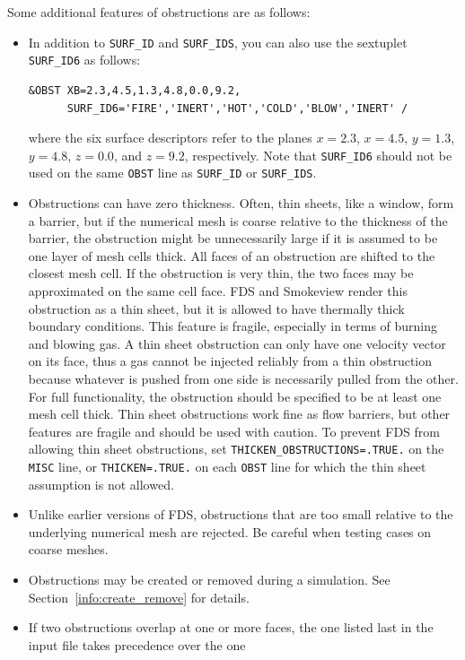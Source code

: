 \documentclass[11pt]{book}
\newcommand{\ct}{\tt\small}
\begin{document}
\noindent
Some additional features of obstructions are as follows:
\begin{itemize}
\item In addition to {\ct SURF\_ID} and {\ct SURF\_IDS}, you can also use
the sextuplet {\ct SURF\_ID6} as follows:

\footnotesize
\begin{verbatim}
&OBST XB=2.3,4.5,1.3,4.8,0.0,9.2,
      SURF_ID6='FIRE','INERT','HOT','COLD','BLOW','INERT' /
\end{verbatim}
\normalsize
where the six surface descriptors refer to the planes $x=2.3$, $x=4.5$, $y=1.3$, $y=4.8$,
$z=0.0$, and $z=9.2$, respectively.
Note that {\ct SURF\_ID6} should not be used on the same {\ct OBST}
line as {\ct SURF\_ID} or {\ct SURF\_IDS}.
\item Obstructions can have zero thickness. Often, thin sheets, like a window, form a barrier,
but if the numerical mesh is coarse relative to the thickness of the barrier, the obstruction
might be unnecessarily large if it is assumed to be one layer of mesh cells thick. All faces
of an obstruction are shifted to the closest mesh cell. If the obstruction is very thin, the two
faces may be approximated on the same cell face. FDS and Smokeview render
this obstruction as a thin sheet, but it is allowed to have thermally
thick boundary conditions. This feature is fragile, especially in terms
of burning and blowing gas. A thin sheet obstruction can only have one velocity
vector on its face, thus a gas cannot be injected reliably from a
thin obstruction because whatever is pushed from one side is necessarily pulled from the other.
For full functionality, the obstruction should be specified to
be at least one mesh cell thick. Thin sheet obstructions
work fine as flow barriers, but other features are fragile and should be used with
caution. To prevent FDS from allowing thin sheet obstructions, set {\ct THICKEN\_OBSTRUCTIONS=.TRUE.} on the
{\ct MISC} line, or {\ct THICKEN=.TRUE.} on each {\ct OBST} line for which the thin sheet assumption is not allowed.
\item Unlike earlier versions of FDS, obstructions that are
too small relative to the underlying numerical mesh are rejected.
Be careful when testing cases on coarse meshes.
\item Obstructions may be created or removed during a simulation. See
Section~\ref{info:create_remove} for details.
\item If two obstructions overlap at one or more faces, the one listed last in the input file takes precedence over the one

\end{itemize}
\end{document}
